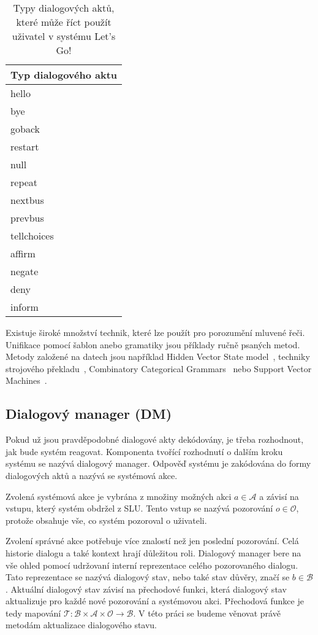 \begin{table}
\begin{center}
\begin{tabular}{|l|}
\hline
Typ dialogového aktu \\
\hline
\hline
hello \\
\hline
bye \\
\hline
goback \\
\hline
restart \\
\hline
null \\
\hline
repeat \\
\hline
nextbus \\
\hline
prevbus \\
\hline
tellchoices \\
\hline
affirm \\
\hline
negate \\
\hline
deny \\
\hline
inform \\
\hline
\end{tabular}
\caption{Typy dialogových aktů, které může říct použít uživatel v systému Let's Go!}
\label{tab:dstcdat}
\end{center}
\end{table}

Existuje široké množství technik, které lze použít pro porozumění mluvené řeči.
Unifikace pomocí šablon anebo gramatiky jsou příklady ručně psaných metod.
Metody založené na datech jsou například Hidden Vector State model~\cite{he2005semantic}, techniky strojového překladu~\cite{wong2007learning}, Combinatory Categorical Grammars~\cite{zettlemoyer2007online} nebo Support Vector Machines~\cite{mairesse2009spoken}.

\subsection{Dialogový manager (DM)}

Pokud už jsou pravděpodobné dialogové akty dekódovány, je třeba rozhodnout, jak bude systém reagovat.
Komponenta tvořící rozhodnutí o dalším kroku systému se nazývá dialogový manager.
Odpověď systému je zakódována do formy dialogových aktů a nazývá se systémová akce.

Zvolená systémová akce je vybrána z množiny možných akci $a \in \mathcal{A}$ a závisí na vstupu, který systém obdržel z SLU.
Tento vstup se nazývá pozorování $o \in \mathcal{O}$, protože obsahuje vše, co systém pozoroval o uživateli.

Zvolení správné akce potřebuje více znalostí než jen poslední pozorování.
Celá historie dialogu a také kontext hrají důležitou roli.
Dialogový manager bere na vše ohled pomocí udržovaní interní reprezentace celého pozorovaného dialogu.
Tato reprezentace se nazývá dialogový stav, nebo také stav důvěry, značí se $b \in \mathcal{B}$.
Aktuální dialogový stav závisí na přechodové funkci, která dialogový stav aktualizuje pro každé nové pozorování a systémovou akci.
Přechodová funkce je tedy mapování $\mathcal{T} : \mathcal{B} \times \mathcal{A} \times \mathcal{O} \longrightarrow \mathcal{B}$.
V této práci se budeme věnovat právě metodám aktualizace dialogového stavu.

